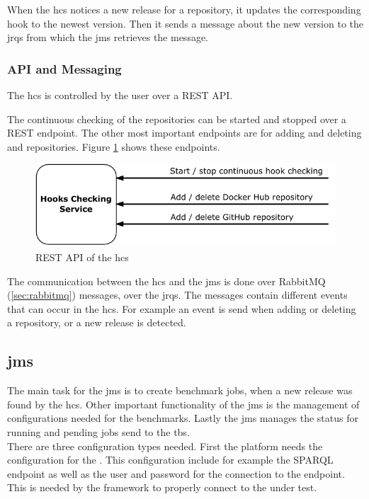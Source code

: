 When the \ac{hcs} notices a new release for a repository, it updates the corresponding hook to the newest version.
Then it sends a message about the new version to the \aclp{jrq} from which the \acl{jms} retrieves the message.

\subsubsection{API and Messaging}
\label{sec:hooks_api}
The \ac{hcs} is controlled by the user over a REST API.

The continuous checking of the repositories can be started and stopped over a REST endpoint.
The other most important endpoints are for adding and deleting \gh{} and \dockh{} repositories.
Figure \ref{fig:rest_apis_approach_hcs} shows these endpoints.
\begin{figure}[tbph]
	\centering
	\includegraphics[width=.57\textwidth]{figures/rest-apis-approach-hcs.pdf}
	\caption{REST API of the \acl{hcs}}
	\label{fig:rest_apis_approach_hcs}
\end{figure}

The communication between the \ac{hcs} and the \acl{jms} is done over RabbitMQ (\ref{sec:rabbitmq}) messages, over the \aclp{jrq}.
The messages contain different events that can occur in the \ac{hcs}.
For example an event is send when adding or deleting a repository, or a new release is detected.


\subsection{\acl{jms}}
\label{sec:jobs_managing_service}
The main task for the \acf{jms} is to create benchmark jobs, when a new release was found by the \ac{hcs}.
Other important functionality of the \ac{jms} is the management of configurations needed for the benchmarks.
Lastly the \ac{jms} manages the status for running and pending jobs send to the \acl{tbs}.
\\

There are three configuration types needed.
First the platform needs the configuration for the \ts{}.
This configuration include for example the SPARQL endpoint as well as the user and password for the connection to the endpoint.
This is needed by the \iguana{} framework to properly connect to the \ts{} under test\cite{IguanaDocumentationConfiguration}.

